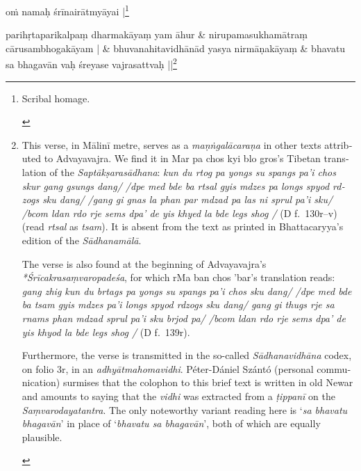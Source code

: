 \documentclass[naipra.tex]{subfiles}
\begin{document}
\beginnumbering
\begin{sanskrit}
\pstart\noindent
{}oṁ namaḥ śrīnairātmyāyai |\footnote{\begin{english}
	Scribal homage.
\end{english}}
\pend

\medskip\versequote
parihṛtaparikalpaṃ dharmakāyaṃ yam āhur &
\hspace{20pt}nirupamasukhamātraṃ cārusambhogakāyam | \&
\versequote
bhuvanahitavidhānād yasya nirmāṇakāyaṃ &
\hspace{20pt}bhavatu sa bhagavān vaḥ śreyase vajrasattvaḥ ||\footnote{\begin{english}
	This verse, in Mālinī metre, serves as a \emph{maṇṅgalācaraṇa} in other texts attributed to Advayavajra.
	We find it in Mar pa chos kyi blo gros's Tibetan translation of the \emph{Saptākṣarasādhana}: \emph{kun du rtog pa yongs su spangs pa'i chos skur gang gsungs dang/ /dpe med bde ba rtsal gyis mdzes pa longs spyod rdzogs sku dang/ /gang gi gnas la phan par mdzad pa las ni sprul pa'i sku/ /bcom ldan rdo rje sems dpa' de yis khyed la bde legs shog /} (D f.\ 130r–v) (read \emph{rtsal} as \emph{tsam}).
	It is absent from the text as printed in Bhattacaryya's edition of the \emph{Sādhanamālā}.

	\begin{english}
	The verse is also found at the beginning of Advayavajra's \emph{*Śrīcakrasaṃvaropadeśa}, for which rMa ban chos 'bar's translation reads: \emph{gang zhig kun du brtags pa yongs su spangs pa'i chos sku dang/ /dpe med bde ba tsam gyis mdzes pa'i longs spyod rdzogs sku dang/ gang gi thugs rje sa rnams phan mdzad sprul pa'i sku brjod pa/ /bcom ldan rdo rje sems dpa' de yis khyod la bde legs shog /} (D f.\ 139r).
	\end{english}

	Furthermore, the verse is transmitted in the so-called \emph{Sādhanavidhāna} codex, on folio 3r, in an \emph{adhyātmahomavidhi}.
	Péter-Dániel Szántó (personal communication) surmises that the colophon to this brief text is written in old Newar and amounts to saying that the \emph{vidhi} was extracted from a \emph{ṭippanī} on the \emph{Saṃvarodayatantra}. 
	The only noteworthy variant reading here is `\emph{sa bhavatu bhagavān}' in place of `\emph{bhavatu sa bhagavān}', both of which are equally plausible.


\end{english}}
\end{sanskrit}
\end{document}
